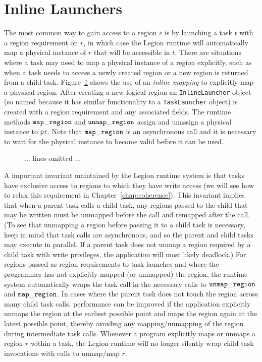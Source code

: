 \section{Inline Launchers}
\label{sec:inlinelaunch}

The most common way to gain access to a region $r$ is by launching a
task $t$ with a region requirement on $r$, in which case the Legion
runtime will automatically map a physical instance of $r$ that will be
accessible in $t$.  There are situations where a task may need to map
a physical instance of a region explicitly, such as when a task needs
to access a newly created region or a new region is returned from a
child task.  Figure~\ref{fig:inlinelaunch} shows the use of an {\em
  inline mapping} to explicitly map a physical region.  After creating
a new logical region an {\tt InlineLauncher} object (so named because
it has similar functionality to a {\tt TaskLauncher} object) is
created with a region requirement and any associated fields.  The
runtime methods $\tt map\_region$ and $\tt unmap\_region$ assign and
unassign a physical instance to {\tt pr}.  Note that $\tt map\_region$
is an asynchronous call and it is necessary to wait for the physical
instance to become valid before it can be used.

\begin{figure}
{\small
  
  ... lines omitted ...\\
  }
\caption{}
\label{fig:inlinelaunch}
\end{figure}

A important invariant maintained by the Legion runtime system is that
tasks have exclusive access to regions to which they have write access
(we will see how to relax this requirement in
Chapter~\ref{chap:coherence}).  This invariant implies that when a
parent task calls a child task, any regions passed to the child that
may be written must be unmapped before the call and remapped after the
call.  (To see that unmapping a region before passing it to a child
task is necessary, keep in mind that task calls are asynchronous, and
so the parent and child tasks may execute in parallel.  If a
parent task does not unmap a region required by a child task with
write privileges, the application will most likely deadlock.)  For
regions passed as region requirements to task launches and where the
programmer has not explicitly mapped (or unmapped) the region, the
runtime system automatically wraps the task call in the necessary
calls to $\tt unmap\_region$ and $\tt map\_region$.  In cases where
the parent task does not touch the region across many child task
calls, performance can be improved if the application explicitly
unmaps the region at the earliest possible point and maps the region
again at the latest possible point, thereby avoiding any
mapping/unmapping of the region during intermediate task calls.
Whenever a program explicitly maps or unmaps a region $r$ within a
task, the Legion runtime will no longer silently wrap child task
invocations with calls to unmap/map $r$.
